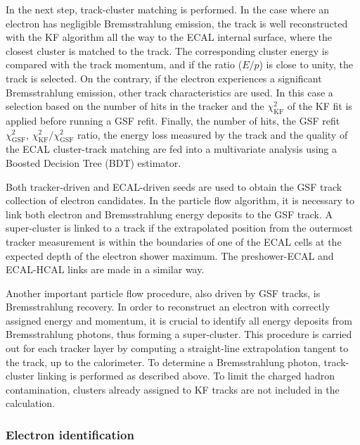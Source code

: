 In the next step, track-cluster matching is performed. In the case where an electron has negligible Bremsstrahlung
emission, the track is well reconstructed with the KF algorithm all the way to the ECAL internal surface, where the
closest cluster is matched to the track. The corresponding cluster energy is compared with the track momentum, and if
the ratio ($E/p$) is close to unity, the track is selected. On the contrary, if the electron experiences a significant
Bremsstrahlung emission, other track characteristics are used. In this case a selection based on the number of hits in
the tracker and the $\chi^2_\textrm{KF}$ of the KF fit is applied before running a GSF refit. Finally, the number of
hits, the GSF refit $\chi^2_\textrm{GSF}$, $\chi^2_\textrm{KF}/\chi^2_\textrm{GSF}$ ratio, the energy loss measured by
the track and the quality of the ECAL cluster-track matching are fed into a multivariate analysis using a Boosted
Decision Tree (BDT) estimator.

Both tracker-driven and ECAL-driven seeds are used to obtain the GSF track collection of electron candidates. In the
particle flow algorithm, it is necessary to link both electron and Bremsstrahlung energy deposits to the GSF track. A
super-cluster is linked to a track if the extrapolated position from the outermost tracker measurement is within the
boundaries of one of the ECAL cells at the expected depth of the electron shower maximum. The preshower-ECAL and
ECAL-HCAL links are made in a similar way.

Another important particle flow procedure, also driven by GSF tracks, is Bremsstrahlung recovery. In order to
reconstruct an electron with correctly assigned energy and momentum, it is crucial to identify all energy deposits from
Bremsstrahlung photons, thus forming a super-cluster. This procedure is carried out for each tracker layer by computing
a straight-line extrapolation tangent to the track, up to the calorimeter. To determine a Bremsstrahlung photon,
track-cluster linking is performed as described above. To limit the charged hadron contamination, clusters already
assigned to KF tracks are not included in the calculation.


\subsubsection{Electron identification}
\label{sss:electron_id}

